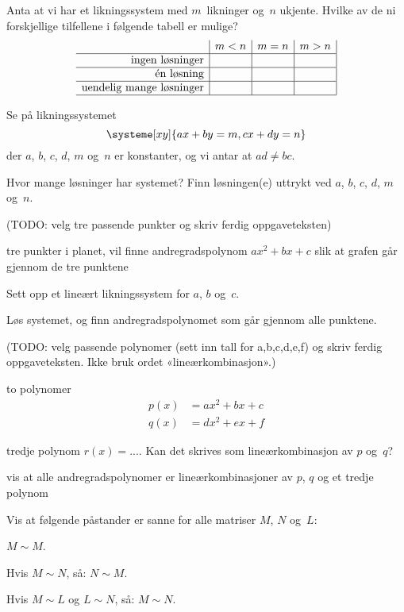 \documentclass[11pt, a4paper, norsk]{NTNUoving}
\newcommand{\roweq}{\sim}
\begin{document}
\begin{oppgave}
Anta at vi har et likningssystem med $m$~likninger og~$n$ ukjente.
Hvilke av de ni forskjellige tilfellene i følgende tabell er mulige?
\[
\begin{array}{r|c|c|c|}
                                & m < n & m = n & m > n \\ \hline
\text{ingen løsninger}          &       &       &       \\ \hline
\text{én løsning}               &       &       &       \\ \hline
\text{uendelig mange løsninger} &       &       &       \\ \hline
\end{array}
\]
\end{oppgave}


\begin{oppgave}
Se på likningssystemet
\[
\systeme[xy]{
  ax + by = m,
  cx + dy = n
}
\]
der $a$, $b$, $c$, $d$, $m$ og~$n$ er konstanter, og vi antar at $ad \ne bc$.

Hvor mange løsninger har systemet?  Finn løsningen(e) uttrykt ved $a$,
$b$, $c$, $d$, $m$ og~$n$.
\end{oppgave}


\begin{oppgave}
(TODO: velg tre passende punkter og skriv ferdig oppgaveteksten)

tre punkter i planet, vil finne andregradspolynom $ax^2 + bx + c$ slik
at grafen går gjennom de tre punktene
\begin{punkt}
Sett opp et lineært likningssystem for $a$, $b$ og~$c$.
\end{punkt}
\begin{punkt}
Løs systemet, og finn andregradspolynomet som går gjennom alle punktene.
\end{punkt}
\end{oppgave}


\begin{oppgave}
(TODO: velg passende polynomer (sett inn tall for a,b,c,d,e,f)
og skriv ferdig oppgaveteksten.  Ikke bruk ordet «lineærkombinasjon».)

to polynomer
\begin{align*}
p(x) &= ax^2 + bx + c \\
q(x) &= dx^2 + ex + f
\end{align*}

tredje polynom $r(x) = ...$.  Kan det skrives som lineærkombinasjon av $p$ og~$q$?

vis at alle andregradspolynomer er lineærkombinasjoner av $p$, $q$ og et tredje polynom
\end{oppgave}


\begin{oppgave}
Vis at følgende påstander er sanne for alle matriser $M$, $N$ og~$L$:
\begin{punkt}
$M \roweq M$.
\end{punkt}
\begin{punkt}
Hvis $M \roweq N$, så: $N \roweq M$.
\end{punkt}
\begin{punkt}
Hvis $M \roweq L$ og $L \roweq N$, så: $M \roweq N$.
\end{punkt}
\end{oppgave}
\end{document}

